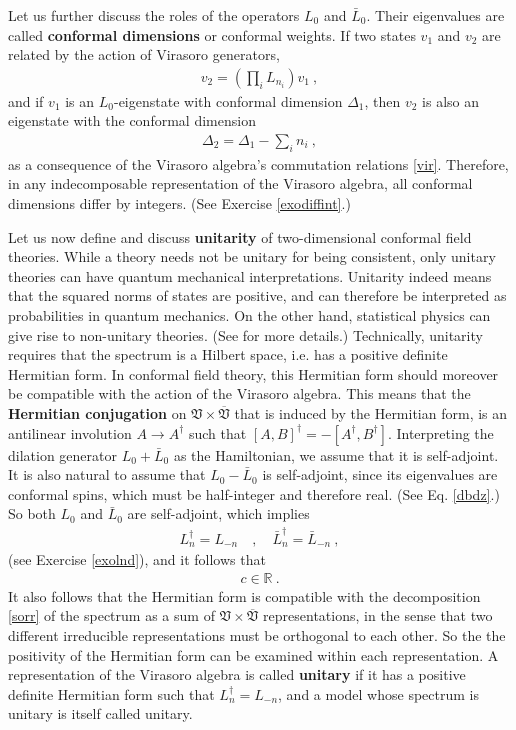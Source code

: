\documentclass[12pt, a4paper, notitlepage, twoside]{report}
\numberwithin{equation}{section}
\theoremstyle{break}
\begin{document}
Let us further discuss the roles of the operators $L_0$ and $\bar L_0$. Their eigenvalues are called \textbf{\boldmath conformal dimensions} or conformal weights. If 
two states $v_1$ and $v_2$ are related by the action of Virasoro generators,
\begin{align}
 v_2 = \left(\prod_i L_{n_i}\right) v_1\ ,
\label{vovt}
\end{align}
and if $v_1$ is an $L_0$-eigenstate with conformal dimension $\Delta_1$, then $v_2$ is also an eigenstate with the conformal dimension
\begin{align}
 \Delta_2 = \Delta_1 - \sum_i n_i\ ,
\label{ddsn}
\end{align}
as a consequence of the Virasoro algebra's commutation relations \eqref{vir}. Therefore, in any indecomposable representation of the Virasoro algebra, all conformal dimensions differ by integers. (See Exercise \ref{exodiffint}.)

Let us now define and discuss \textbf{\boldmath unitarity} of two-dimensional conformal field theories. While a theory needs not be unitary for being consistent, only unitary theories can have quantum mechanical interpretations. Unitarity indeed means that the squared norms of states are positive, and can therefore be interpreted as probabilities in quantum mechanics. On the other hand, statistical physics can give rise to non-unitary theories. (See \cite{prv18} for more details.) Technically, unitarity requires that 
the spectrum is a Hilbert space, i.e. has a positive definite Hermitian form. 
In conformal field theory, this Hermitian form should moreover be compatible with the action of the Virasoro algebra.
This means that the \textbf{Hermitian conjugation} on $\mathfrak{V}\times\overline{\mathfrak{V}}$ that is induced by the Hermitian form, is an antilinear involution $A\to A^\dagger$ such that $[A,B]^\dagger = -[A^\dagger, B^\dagger]$.
Interpreting the dilation generator $L_0+\bar L_0$ as the Hamiltonian, we assume that it is self-adjoint. It is also natural to assume that $L_0-\bar L_0$ is self-adjoint, since its eigenvalues are conformal spins, which must be half-integer and therefore real. (See Eq. \eqref{dbdz}.) So both $L_0$ and $\bar L_0$ are self-adjoint,
which implies
\begin{align}
 L^\dagger_n = L_{-n} \quad , \quad \bar L_n^\dagger = \bar L_{-n}\ ,
\label{ldn}
\end{align}
(see Exercise \ref{exolnd}), and it follows that
\begin{align}
 c\in {\mathbb{R}}\ .
\label{cir}
\end{align}
It also follows that the Hermitian form is compatible with the decomposition \eqref{sorr} of the spectrum as a sum of $\mathfrak{V}\times \overline{\mathfrak{V}}$ representations, in the sense that two different irreducible representations must be orthogonal to each other.
So the the positivity of the Hermitian form can be examined within each representation.
A representation of the Virasoro algebra is called \textbf{\boldmath unitary} if it has a positive definite Hermitian form such that 
$L^\dagger_n = L_{-n}$, and a model whose spectrum is unitary is itself called unitary. 
\end{document}
